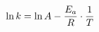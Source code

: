 \documentclass[preview]{standalone}
\begin{document}
\begin{align*}
\special{dvisvgm:raw <g id='unique000'>}\ln k = \ln A - \frac{E_a}{R} \cdot \frac{1}{T}\special{dvisvgm:raw </g>}
\end{align*}
\end{document}
